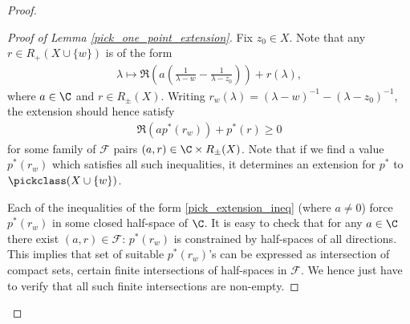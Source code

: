 \begin{proof}
	\begin{proof}[Proof of Lemma \ref{pick_one_point_extension}]
		Fix $z_{0} \in X$. Note that any $r \in R_{+}(X \cup \{w\})$ is of the form
		\begin{align*}
		\lambda \mapsto \Re\left(a \left(\frac{1}{\lambda - w} - \frac{1}{\lambda - z_{0}}\right)\right) + r(\lambda),
		\end{align*}
		where $a \in \C$ and $r \in R_{\pm}(X)$. Writing $r_{w}(\lambda) = (\lambda - w)^{-1} - (\lambda - z_{0})^{-1}$, the extension should hence satisfy
		\begin{align}\label{pick_extension_ineq}
			\Re\left(a p^{*}(r_{w})\right) + p^{*}(r) \geq 0
		\end{align}
		for some family of $\mathcal{F}$ pairs $(a, r) \in \C \times R_{\pm}(X)$. Note that if we find a value $p^{*}(r_{w})$ which satisfies all such inequalities, it determines an extension for $p^{*}$ to $\pickclass(X \cup \{w\})$.

		Each of the inequalities of the form \ref{pick_extension_ineq} (where $a \neq 0$) force $p^{*}(r_{w})$ in some closed half-space of $\C$. It is easy to check that for any $a \in \C$ there exist $(a, r) \in \mathcal{F}$: $p^{*}(r_{w})$ is constrained by half-spaces of all directions. This implies that set of suitable $p^{*}(r_{w})$'s can be expressed as intersection of compact sets, certain finite intersections of half-spaces in $\mathcal{F}$. We hence just have to verify that all such finite intersections are non-empty.


\end{proof}
\end{proof}

